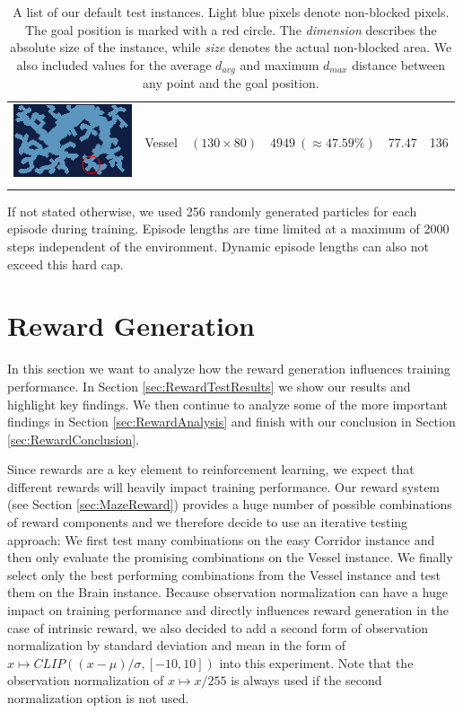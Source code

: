 \begin{table} [ht!]
\begin{center}
\begin{tabular}{cccccc}
            \parbox[c]{3.5cm}{\includegraphics[clip, width=3.5cm]{figures/evaluation/procedure/vessel_upscaled.png}} & Vessel & $(130 \times 80)$ & $4949 \ (\approx 47.59\%)$ & 77.47 & 136 \\
            \addlinespace[0.05cm]
            \bottomrule
        \end{tabular}
    \end{center}
    \caption[Test Instances]{A list of our default test instances. Light blue pixels denote non-blocked pixels. The goal position is marked with a red circle. The \textit{dimension} describes the absolute size of the instance, while \textit{size} denotes the actual non-blocked area. We also included values for the average $d_{avg}$ and maximum $d_{max}$ distance between any point and the goal position.} \label{tab:TestInstances}
\end{table}

If not stated otherwise, we used 256 randomly generated particles for each episode during training. Episode lengths are time limited at a maximum of 2000 steps independent of the environment. Dynamic episode lengths can also not exceed this hard cap.

\section{Reward Generation} \label{sec:EvalReward}
In this section we want to analyze how the reward generation influences training performance. In Section \ref{sec:RewardTestResults} we show our results and highlight key findings. We then continue to analyze some of the more important findings in Section \ref{sec:RewardAnalysis} and finish with our conclusion in Section \ref{sec:RewardConclusion}.

Since rewards are a key element to reinforcement learning, we expect that different rewards will heavily impact training performance. Our reward system (see Section \ref{sec:MazeReward}) provides a huge number of possible combinations of reward components and we therefore decide to use an iterative testing approach: We first test many combinations on the easy Corridor instance and then only evaluate the promising combinations on the Vessel instance. We finally select only the best performing combinations from the Vessel instance and test them on the Brain instance. Because observation normalization can have a huge impact on training performance and directly influences reward generation in the case of intrinsic reward, we also decided to add a second form of observation normalization by standard deviation and mean in the form of $x \mapsto CLIP((x - \mu)/\sigma, [-10, 10])$ into this experiment. Note that the observation normalization of $x \mapsto x/255$ is always used if the second normalization option is not used.

